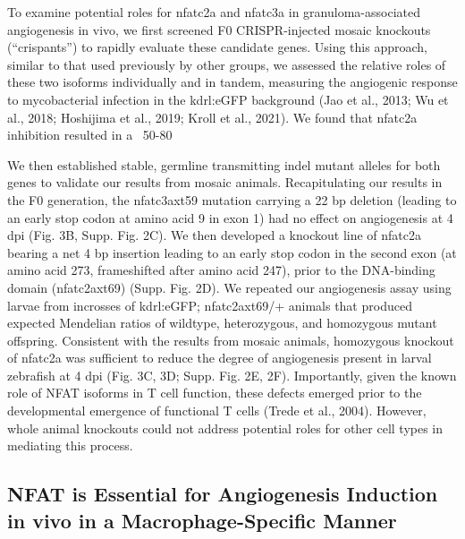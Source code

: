 To examine potential roles for nfatc2a and nfatc3a in granuloma-associated angiogenesis in vivo, we first screened F0 CRISPR-injected mosaic knockouts (“crispants”) to rapidly evaluate these candidate genes. Using this approach, similar to that used previously by other groups, we assessed the relative roles of these two isoforms individually and in tandem, measuring the angiogenic response to mycobacterial infection in the kdrl:eGFP background (Jao et al., 2013; Wu et al., 2018; Hoshijima et al., 2019; Kroll et al., 2021). We found that nfatc2a inhibition resulted in a ~50-80%

We then established stable, germline transmitting indel mutant alleles for both genes to validate our results from mosaic animals. Recapitulating our results in the F0 generation, the nfatc3axt59 mutation carrying a 22 bp deletion (leading to an early stop codon at amino acid 9 in exon 1) had no effect on angiogenesis at 4 dpi (Fig. 3B, Supp. Fig. 2C). We then developed a knockout line of nfatc2a bearing a net 4 bp insertion leading to an early stop codon in the second exon (at amino acid 273, frameshifted after amino acid 247), prior to the DNA-binding domain (nfatc2axt69) (Supp. Fig. 2D). We repeated our angiogenesis assay using larvae from incrosses of kdrl:eGFP; nfatc2axt69/+ animals that produced expected Mendelian ratios of wildtype, heterozygous, and homozygous mutant offspring. Consistent with the results from mosaic animals, homozygous knockout of nfatc2a was sufficient to reduce the degree of angiogenesis present in larval zebrafish at 4 dpi (Fig. 3C, 3D; Supp. Fig. 2E, 2F). Importantly, given the known role of NFAT isoforms in T cell function, these defects emerged prior to the developmental emergence of functional T cells (Trede et al., 2004). However, whole animal knockouts could not address potential roles for other cell types in mediating this process. 

\subsection{NFAT is Essential for Angiogenesis Induction in vivo in a Macrophage-Specific Manner}

